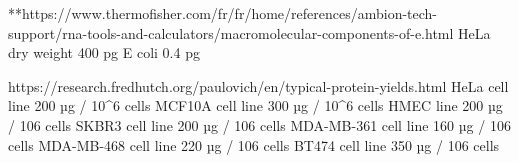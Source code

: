 \documentclass[11pt,a4paper]{article}
\begin{document}
**https://www.thermofisher.com/fr/fr/home/references/ambion-tech-support/rna-tools-and-calculators/macromolecular-components-of-e.html
HeLa dry weight 400 pg
E coli 0.4 pg

https://research.fredhutch.org/paulovich/en/typical-protein-yields.html
HeLa cell line 	200 µg / 10^6 cells
MCF10A cell line 	300 µg / 10^6 cells
HMEC line 	200 µg / 106 cells
SKBR3 cell line 	200 µg / 106 cells 
MDA-MB-361 cell line 	160 µg / 106 cells
MDA-MB-468 cell line 	220 µg / 106 cells
BT474 cell line 	350 µg / 106 cells
\end{document}
